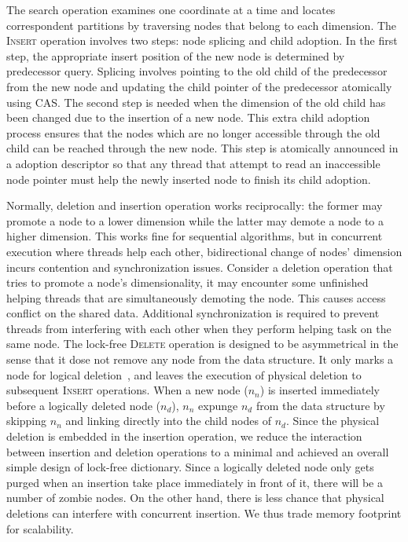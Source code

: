 \documentclass{article}
\begin{document}
The search operation examines one coordinate at a time and locates correspondent partitions by traversing nodes that belong to each dimension. 
The \textsc{Insert} operation involves two steps: node splicing and child adoption.
In the first step, the appropriate insert position of the new node is determined by predecessor query.
Splicing involves pointing to the old child of the predecessor from the new node and updating the child pointer of the predecessor atomically using CAS.
The second step is needed when the dimension of the old child has been changed due to the insertion of a new node.
This extra child adoption process ensures that the nodes which are no longer accessible through the old child can be reached through the new node.
This step is atomically announced in a adoption descriptor so that any thread that attempt to read an inaccessible node pointer must help the newly inserted node to finish its child adoption.

Normally, deletion and insertion operation works reciprocally: the former may promote a node to a lower dimension while the latter may demote a node to a higher dimension.
This works fine for sequential algorithms, but in concurrent execution where threads help each other, bidirectional change of nodes' dimension incurs contention and synchronization issues.
Consider a deletion operation that tries to promote a node's dimensionality, it may encounter some unfinished helping threads that are simultaneously demoting the node.
This causes access conflict on the shared data. 
Additional synchronization is required to prevent threads from interfering with each other when they perform helping task on the same node.
The lock-free \textsc{Delete} operation is designed to be asymmetrical in the sense that it dose not remove any node from the data structure.
It only marks a node for logical deletion~\cite{harris2001pragmatic}, and leaves the execution of physical deletion to subsequent \textsc{Insert} operations.
When a new node ($n_n$) is inserted immediately before a logically deleted node ($n_d$), $n_n$ expunge $n_d$ from the data structure by skipping $n_n$ and linking directly into the child nodes of $n_d$.
Since the physical deletion is embedded in the insertion operation, we reduce the interaction between insertion and deletion operations to a minimal and achieved an overall simple design of lock-free dictionary.
Since a logically deleted node only gets purged when an insertion take place immediately in front of it, there will be a number of zombie nodes.
On the other hand, there is less chance that physical deletions can interfere with concurrent insertion.
We thus trade memory footprint for scalability.
\end{document}
